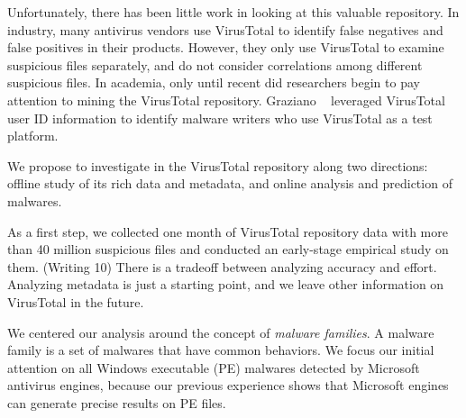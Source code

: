 Unfortunately, there has been little work in looking at this valuable repository.
In industry, many antivirus vendors use VirusTotal to identify false negatives 
and false positives in their products. 
However, they only use VirusTotal to examine suspicious files separately, 
and do not consider correlations among different suspicious files. 
In academia, only until recent did researchers begin to pay attention to mining the VirusTotal repository. 
Graziano \etal~\cite{neeles} leveraged VirusTotal user ID information to identify malware writers 
who use VirusTotal as a test platform. 

We propose to investigate in the VirusTotal repository along two directions:
offline study of its rich data and metadata, 
and online analysis and prediction of malwares.

As a first step, we collected one month of VirusTotal repository data with more than 40 million suspicious files
and conducted an early-stage empirical study on them. 
{\color{red} (Writing 10) There is a tradeoff between analyzing accuracy and effort. 
Analyzing metadata is just a starting point, and we leave other information on VirusTotal in the future. }

We centered our analysis around the concept of {\em malware families}.
A malware family is a set of malwares that have common behaviors.
We focus our initial attention on all Windows executable (PE) malwares detected by Microsoft
antivirus engines, 
because our previous experience shows that Microsoft engines can generate precise results on PE files.

